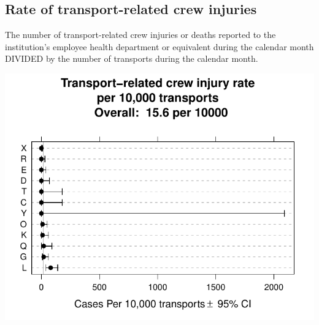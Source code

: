 \documentclass[twoside]{article}\usepackage[]{graphicx}\usepackage[]{color}
\makeatletter
\def\maxwidth{ %
  \ifdim\Gin@nat@width>\linewidth
    \linewidth
  \else
    \Gin@nat@width
  \fi
}
\newenvironment{knitrout}{}{} %
\makeatother
\begin{document}
\newpage
\subsection{Rate of transport-related crew injuries}
The number of transport-related crew injuries or deaths reported to the institution's employee health department or equivalent during the calendar month DIVIDED by the number of transports during the calendar month.

\begin{center}
\begin{knitrout}
\color{fgcolor}
\includegraphics[width=\maxwidth]{figure/r_crew_injuries} 

\end{knitrout}

\end{center}
\end{document}
